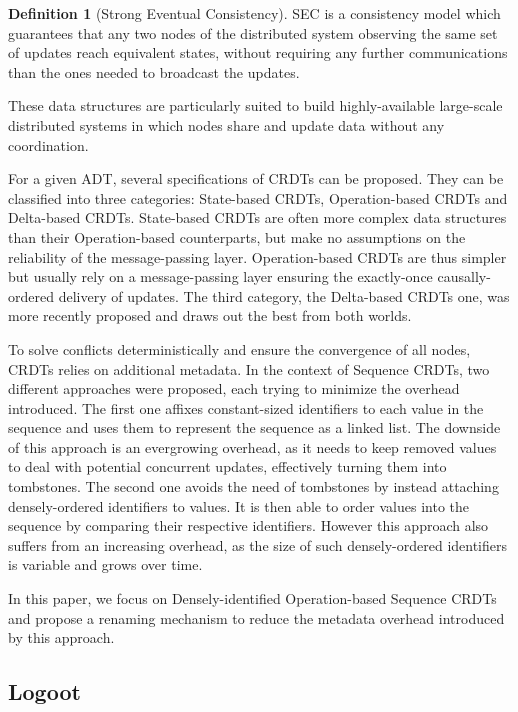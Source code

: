\documentclass{article}
\newcounter{definition-counter}
\theoremstyle{definition}
\newtheorem{definition}[definition-counter]{Definition}
\theoremstyle{definition}
\theoremstyle{definition}
\theoremstyle{definition}
\begin{document}
\begin{definition}[Strong Eventual Consistency]\label{def:sec}
\acf{SEC} is a consistency model which guarantees that any two nodes of the distributed system observing the same set of updates reach equivalent states, without requiring any further communications than the ones needed to broadcast the updates.
\end{definition}

These data structures are particularly suited to build highly-available large-scale distributed systems in which nodes share and update data without any coordination.

For a given \ac{ADT}, several specifications of \acp{CRDT} can be proposed.
They can be classified into three categories: State-based \acp{CRDT}, Operation-based \acp{CRDT} and Delta-based \acp{CRDT}.
State-based \acp{CRDT} are often more complex data structures than their Operation-based counterparts, but make no assumptions on the reliability of the message-passing layer.
Operation-based \acp{CRDT} are thus simpler but usually rely on a message-passing layer ensuring the exactly-once causally-ordered delivery of updates.
The third category, the Delta-based \acp{CRDT} one, was more recently proposed and draws out the best from both worlds.

To solve conflicts deterministically and ensure the convergence of all nodes, \acp{CRDT} relies on additional metadata.
In the context of Sequence \acp{CRDT}, two different approaches were proposed, each trying to minimize the overhead introduced.
The first one affixes constant-sized identifiers to each value in the sequence and uses them to represent the sequence as a linked list.
The downside of this approach is an evergrowing overhead, as it needs to keep removed values to deal with potential concurrent updates, effectively turning them into tombstones.
The second one avoids the need of tombstones by instead attaching densely-ordered identifiers to values.
It is then able to order values into the sequence by comparing their respective identifiers.
However this approach also suffers from an increasing overhead, as the size of such densely-ordered identifiers is variable and grows over time.

In this paper, we focus on Densely-identified Operation-based Sequence \acp{CRDT} and propose a renaming mechanism to reduce the metadata overhead introduced by this approach.

\subsection{Logoot \cite{WeissICDCS09}}
\end{document}
